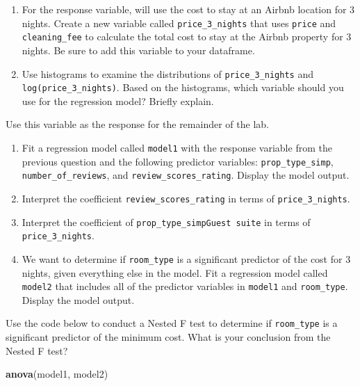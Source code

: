 \documentclass[]{book}
\newenvironment{Shaded}{\begin{snugshade}}{\end{snugshade}}
\newcommand{\KeywordTok}[1]{\textcolor[rgb]{0.13,0.29,0.53}{\textbf{#1}}}
\newcommand{\NormalTok}[1]{#1}
\begin{document}
\begin{enumerate}
\def\labelenumi{\arabic{enumi}.}
\setcounter{enumi}{8}
\item
  For the response variable, will use the cost to stay at an Airbnb
  location for 3 nights. Create a new variable called
  \texttt{price\_3\_nights} that uses \texttt{price} and
  \texttt{cleaning\_fee} to calculate the total cost to stay at the
  Airbnb property for 3 nights. Be sure to add this variable to your
  dataframe.
\item
  Use histograms to examine the distributions of
  \texttt{price\_3\_nights} and \texttt{log(price\_3\_nights)}. Based on
  the histograms, which variable should you use for the regression
  model? Briefly explain.
\end{enumerate}

Use this variable as the response for the remainder of the lab.

\begin{enumerate}
\def\labelenumi{\arabic{enumi}.}
\setcounter{enumi}{10}
\item
  Fit a regression model called \texttt{model1} with the response
  variable from the previous question and the following predictor
  variables: \texttt{prop\_type\_simp}, \texttt{number\_of\_reviews},
  and \texttt{review\_scores\_rating}. Display the model output.
\item
  Interpret the coefficient \texttt{review\_scores\_rating} in terms of
  \texttt{price\_3\_nights}.
\item
  Interpret the coefficient of \texttt{prop\_type\_simpGuest\ suite} in
  terms of \texttt{price\_3\_nights}.
\item
  We want to determine if \texttt{room\_type} is a significant predictor
  of the cost for 3 nights, given everything else in the model. Fit a
  regression model called \texttt{model2} that includes all of the
  predictor variables in \texttt{model1} and \texttt{room\_type}.
  Display the model output.
\end{enumerate}

Use the code below to conduct a Nested F test to determine if
\texttt{room\_type} is a significant predictor of the minimum cost. What
is your conclusion from the Nested F test?

\begin{Shaded}
\begin{Highlighting}[]
\KeywordTok{anova}\NormalTok{(model1, model2)}
\end{Highlighting}
\end{Shaded}
\end{document}
